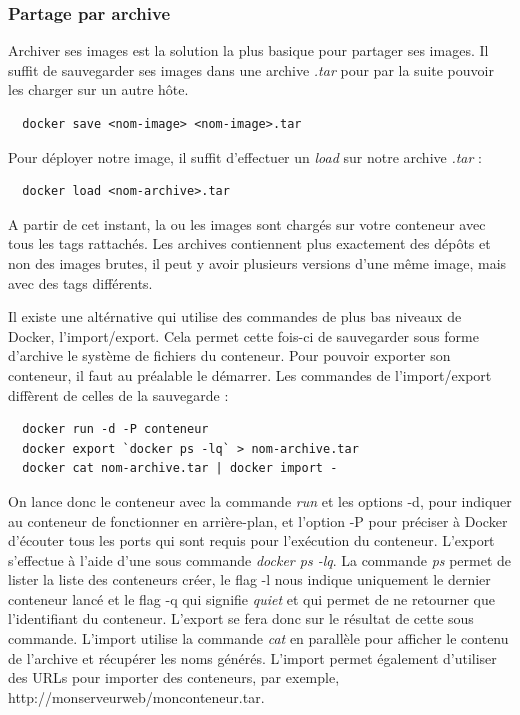 \documentclass[12pt,a4paper]{article}
\begin{document}
\subsubsection{Partage par archive}

Archiver ses images est la solution la plus basique pour partager ses images. Il suffit de sauvegarder ses images dans une archive \textit{.tar} pour par la suite pouvoir les charger sur un autre hôte.
\begin{lstlisting}
  docker save <nom-image> <nom-image>.tar
\end{lstlisting}

Pour déployer notre image, il suffit d'effectuer un \textit{load} sur notre archive \textit{.tar} :

\begin{lstlisting}
  docker load <nom-archive>.tar
\end{lstlisting}

A partir de cet instant, la ou les images sont chargés sur votre conteneur avec tous les tags rattachés. Les archives contiennent plus exactement des dépôts et non des images brutes, il peut y avoir plusieurs versions d'une même image, mais avec des tags différents.

Il existe une altérnative qui utilise des commandes de plus bas niveaux de Docker, l'import/export. Cela permet cette fois-ci de sauvegarder sous forme d'archive le système de fichiers du conteneur. Pour pouvoir exporter son conteneur, il faut au préalable le démarrer. Les commandes de l'import/export diffèrent de celles de la sauvegarde :

\begin{lstlisting}
  docker run -d -P conteneur
  docker export `docker ps -lq` > nom-archive.tar
  docker cat nom-archive.tar | docker import -
\end{lstlisting}

On lance donc le conteneur avec la commande \textit{run} et les options -d, pour indiquer au conteneur de fonctionner en arrière-plan, et l'option -P pour préciser à Docker d'écouter tous les ports qui sont requis pour l'exécution du conteneur. L'export s'effectue à l'aide d'une sous commande \textit{docker ps -lq}. La commande \textit{ps} permet de lister la liste des conteneurs créer, le flag -l nous indique uniquement le dernier conteneur lancé et le flag -q qui signifie \textit{quiet} et qui permet de ne retourner que l'identifiant du conteneur. L'export se fera donc sur le résultat de cette sous commande. L'import utilise la commande \textit{cat} en parallèle pour afficher le contenu de l'archive et récupérer les noms générés. L'import permet également d'utiliser des URLs pour importer des conteneurs, par exemple, http://monserveurweb/monconteneur.tar.
\end{document}
